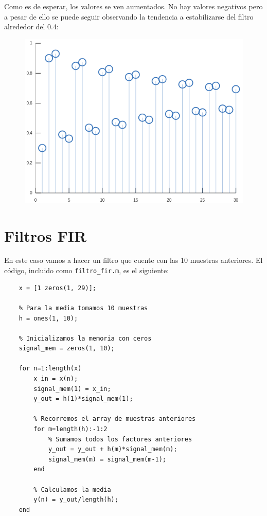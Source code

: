 \documentclass[11pt,a4paper]{article}
\begin{document}
Como es de esperar, los valores se ven aumentados. No hay valores negativos pero a pesar de ello se puede seguir observando la tendencia a estabilizarse del filtro alrededor del 0.4:

\begin{figure}[H]
	\centering
	\includegraphics[scale=0.5]{img/iir-escalon.png}
\end{figure}

\section{Filtros FIR}

En este caso vamos a hacer un filtro que cuente con las 10 muestras anteriores. El código, incluido como \texttt{filtro\_fir.m}, es el siguiente:

\begin{lstlisting}[frame=single]
	% Se definen el array con los pulsos
	x = [1 zeros(1, 29)];

	% Para la media tomamos 10 muestras
	h = ones(1, 10);

	% Inicializamos la memoria con ceros
	signal_mem = zeros(1, 10);

	for n=1:length(x)
		x_in = x(n);
		signal_mem(1) = x_in;
		y_out = h(1)*signal_mem(1);

		% Recorremos el array de muestras anteriores
		for m=length(h):-1:2
			% Sumamos todos los factores anteriores
			y_out = y_out + h(m)*signal_mem(m);
			signal_mem(m) = signal_mem(m-1);
		end

		% Calculamos la media
		y(n) = y_out/length(h);
	end
\end{lstlisting}
\end{document}
